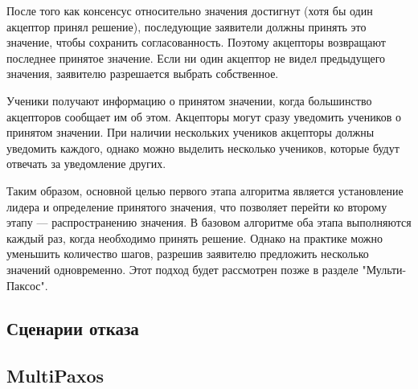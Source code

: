 После того как консенсус относительно значения достигнут (хотя бы один акцептор принял решение), последующие заявители должны принять это значение, чтобы сохранить согласованность. Поэтому акцепторы возвращают последнее принятое значение. Если ни один акцептор не видел предыдущего значения, заявителю разрешается выбрать собственное.

Ученики получают информацию о принятом значении, когда большинство акцепторов сообщает им об этом. Акцепторы могут сразу уведомить учеников о принятом значении. При наличии нескольких учеников акцепторы должны уведомить каждого, однако можно выделить несколько учеников, которые будут отвечать за уведомление других.

Таким образом, основной целью первого этапа алгоритма является установление лидера и определение принятого значения, что позволяет перейти ко второму этапу — распространению значения. В базовом алгоритме оба этапа выполняются каждый раз, когда необходимо принять решение. Однако на практике можно уменьшить количество шагов, разрешив заявителю предложить несколько значений одновременно. Этот подход будет рассмотрен позже в разделе "Мульти-Паксос".

\subsection{Сценарии отказа}
\subsection{MultiPaxos}
